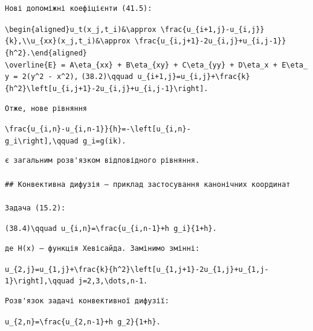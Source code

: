 \documentclass[
  ukrainian,
]{article}
\begin{document}
\begin{verbatim}
Нові допоміжні коефіцієнти (41.5):
\end{verbatim}

\texttt{\textbackslash{}begin\{aligned\}u\_t(x\_j,t\_i)\&\textbackslash{}approx\ \textbackslash{}frac\{u\_\{i+1,j\}-u\_\{i,j\}\}\{k\},\textbackslash{}\textbackslash{}u\_\{xx\}(x\_j,t\_i)\&\textbackslash{}approx\ \textbackslash{}frac\{u\_\{i,j+1\}-2u\_\{i,j\}+u\_\{i,j-1\}\}\{h\^{}2\}.\textbackslash{}end\{aligned\}}
\texttt{\textbackslash{}overline\{E\}\ =\ A\textbackslash{}eta\_\{xx\}\ +\ B\textbackslash{}eta\_\{xy\}\ +\ C\textbackslash{}eta\_\{yy\}\ +\ D\textbackslash{}eta\_x\ +\ E\textbackslash{}eta\_y\ =\ 2(y\^{}2\ -\ x\^{}2),}
\texttt{(38.2)\textbackslash{}qquad\ u\_\{i+1,j\}=u\_\{i,j\}+\textbackslash{}frac\{k\}\{h\^{}2\}\textbackslash{}left{[}u\_\{i,j+1\}-2u\_\{i,j\}+u\_\{i,j-1\}\textbackslash{}right{]}.}

\begin{verbatim}
Отже, нове рівняння
\end{verbatim}

\texttt{\textbackslash{}frac\{u\_\{i,n\}-u\_\{i,n-1\}\}\{h\}=-\textbackslash{}left{[}u\_\{i,n\}-g\_i\textbackslash{}right{]},\textbackslash{}qquad\ g\_i=g(ik).}

\begin{verbatim}
є загальним розв'язком відповідного рівняння.

## Конвективна дифузія — приклад застосування канонічних координат

Задача (15.2):
\end{verbatim}

\texttt{(38.4)\textbackslash{}qquad\ u\_\{i,n\}=\textbackslash{}frac\{u\_\{i,n-1\}+h\ g\_i\}\{1+h\}.}

\begin{verbatim}
де H(x) — функція Хевісайда. Замінимо змінні:
\end{verbatim}

\texttt{u\_\{2,j\}=u\_\{1,j\}+\textbackslash{}frac\{k\}\{h\^{}2\}\textbackslash{}left{[}u\_\{1,j+1\}-2u\_\{1,j\}+u\_\{1,j-1\}\textbackslash{}right{]},\textbackslash{}qquad\ j=2,3,\textbackslash{}dots,n-1.}

\begin{verbatim}
Розв'язок задачі конвективної дифузії:
\end{verbatim}

\texttt{u\_\{2,n\}=\textbackslash{}frac\{u\_\{2,n-1\}+h\ g\_2\}\{1+h\}.}
\end{document}
